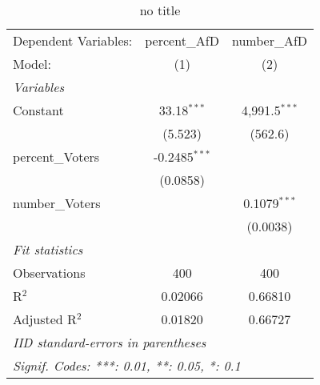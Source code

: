 \begin{table}[htbp]
   \caption{no title}
   \centering
   \begin{tabular}{lcc}
      \tabularnewline \midrule \midrule
      Dependent Variables: & percent\_AfD    & number\_AfD\\   
      Model:               & (1)             & (2)\\  
      \midrule
      \emph{Variables}\\
      Constant             & 33.18$^{***}$   & 4,991.5$^{***}$\\   
                           & (5.523)         & (562.6)\\   
      percent\_Voters      & -0.2485$^{***}$ &   \\   
                           & (0.0858)        &   \\   
      number\_Voters       &                 & 0.1079$^{***}$\\   
                           &                 & (0.0038)\\   
      \midrule
      \emph{Fit statistics}\\
      Observations         & 400             & 400\\  
      R$^2$                & 0.02066         & 0.66810\\  
      Adjusted R$^2$       & 0.01820         & 0.66727\\  
      \bottomrule \bottomrule
      \multicolumn{3}{l}{\emph{IID standard-errors in parentheses}}\\
      \multicolumn{3}{l}{\emph{Signif. Codes: ***: 0.01, **: 0.05, *: 0.1}}\\
   \end{tabular}
\end{table}